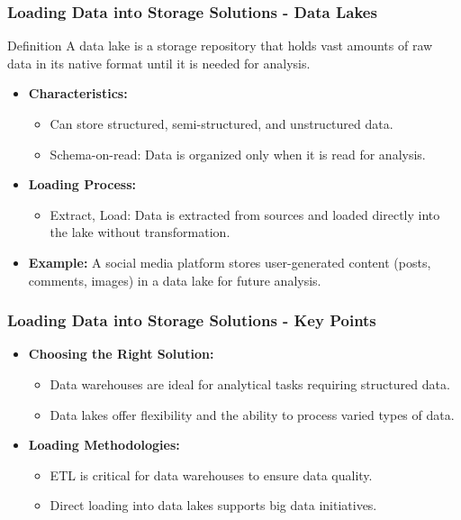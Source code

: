 \documentclass[aspectratio=169]{beamer}
\begin{document}
\begin{frame}[fragile]
    \frametitle{Loading Data into Storage Solutions - Data Lakes}
    \begin{block}{Definition}
        A data lake is a storage repository that holds vast amounts of raw data in its native format until it is needed for analysis.
    \end{block}
    \begin{itemize}
        \item \textbf{Characteristics:}
        \begin{itemize}
            \item Can store structured, semi-structured, and unstructured data.
            \item Schema-on-read: Data is organized only when it is read for analysis.
        \end{itemize}
        \item \textbf{Loading Process:}
        \begin{itemize}
            \item Extract, Load: Data is extracted from sources and loaded directly into the lake without transformation.
        \end{itemize}
        \item \textbf{Example:}
        A social media platform stores user-generated content (posts, comments, images) in a data lake for future analysis.
    \end{itemize}
\end{frame}

\begin{frame}[fragile]
    \frametitle{Loading Data into Storage Solutions - Key Points}
    \begin{itemize}
        \item \textbf{Choosing the Right Solution:}
        \begin{itemize}
            \item Data warehouses are ideal for analytical tasks requiring structured data.
            \item Data lakes offer flexibility and the ability to process varied types of data.
        \end{itemize}
        \item \textbf{Loading Methodologies:}
        \begin{itemize}
            \item ETL is critical for data warehouses to ensure data quality.
            \item Direct loading into data lakes supports big data initiatives.
        \end{itemize}
    \end{itemize}
\end{frame}
\end{document}

